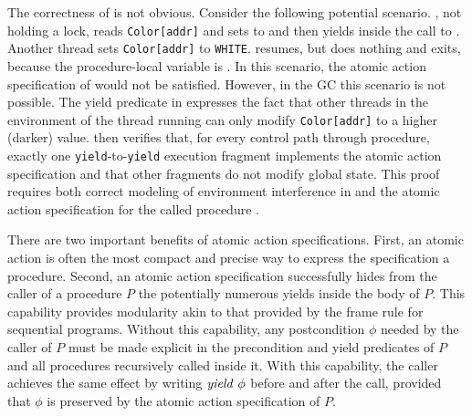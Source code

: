 The correctness of  is not obvious.
Consider the following potential scenario. 
, not holding a lock, reads {\tt Color[addr]} and
sets  to  and then yields inside the call to
. Another thread sets {\tt Color[addr]} to
{\tt WHITE}.  resumes, but does nothing and exits,
because the procedure-local variable  is . In this scenario, the atomic action
specification of  would not be satisfied. However, in the GC this
scenario is not possible. 
The yield predicate in  expresses the fact that
other threads in the environment of the thread running  can
only modify {\tt Color[addr]} to a higher (darker) value. 
\civl then verifies that, for every control path through 
procedure, exactly one {\tt yield}-to-{\tt yield} execution
fragment implements the atomic action specification and that other fragments do not modify
global state. 
This proof requires both correct modeling of environment interference in 
and the atomic action specification for the called procedure .

There are two important benefits of atomic action specifications.
First, an atomic action is often the most compact and precise way to express the specification a procedure.
Second, an atomic action specification successfully hides from the caller of a procedure $P$
the potentially numerous yields inside the body of $P$.
This capability provides modularity akin to that provided by the frame rule for sequential programs.
Without this capability, any postcondition $\phi$ needed by the caller of $P$ must be made explicit in the precondition 
and yield predicates of $P$ and all procedures recursively called inside it.
With this capability, the caller achieves the same effect by writing $\mathit{yield}\ \phi$ before and after the call, 
provided that $\phi$ is preserved by the atomic action specification of $P$.


